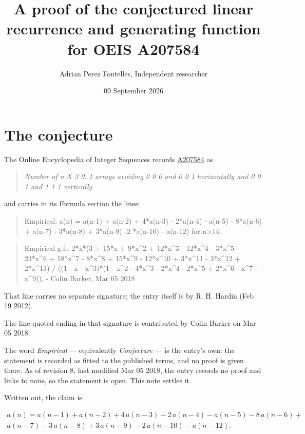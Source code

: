 \documentclass[11pt]{article}
\title{A proof of the conjectured linear recurrence and generating function for OEIS A207584}
\author{Adrian Perez Fontelles, Independent researcher}
\date{09 September 2026}
\theoremstyle{definition}
\begin{document}
\maketitle
\section{The conjecture}

The Online Encyclopedia of Integer Sequences records \href{https://oeis.org/A207584}{A207584} as

\begin{quote}\itshape Number of n X 3 0..1 arrays avoiding 0 0 0 and 0 0 1 horizontally and 0 0 1 and 1 1 1 vertically\end{quote}

and carries in its Formula section the lines:

\begin{quote}\ttfamily Empirical: a(n) = a(n-1) + a(n-2) + 4*a(n-3) - 2*a(n-4) - a(n-5) - 8*a(n-6) + a(n-7) - 3*a(n-8) + 3*a(n-9) -2 *a(n-10) - a(n-12) for n>14.\end{quote}

\begin{quote}\ttfamily Empirical g.f.: 2*x*(3 + 15*x + 9*x\textasciicircum{}2 + 12*x\textasciicircum{}3 - 12*x\textasciicircum{}4 - 3*x\textasciicircum{}5 - 23*x\textasciicircum{}6 + 18*x\textasciicircum{}7 - 8*x\textasciicircum{}8 + 15*x\textasciicircum{}9 - 12*x\textasciicircum{}10 + 3*x\textasciicircum{}11 - 3*x\textasciicircum{}12 + 2*x\textasciicircum{}13) / ((1 - x - x\textasciicircum{}3)*(1 - x\textasciicircum{}2 - 4*x\textasciicircum{}3 - 2*x\textasciicircum{}4 - 2*x\textasciicircum{}5 + 2*x\textasciicircum{}6 - x\textasciicircum{}7 - x\textasciicircum{}9)). - Colin Barker, Mar 05 2018\end{quote}

That line carries no separate signature; the entry itself is by R. H. Hardin (Feb 19 2012).

The line quoted ending in that signature is contributed by Colin Barker on Mar 05 2018.

The word {\itshape Empirical} --- equivalently {\itshape Conjecture} --- is the entry's own: the statement is recorded as fitted to the published terms, and no proof is given there. As of revision 8, last modified Mar 05 2018, the entry records no proof and links to none, so the statement is open. This note settles it.

Written out, the claim is

\begin{multline*} a(n) = a(n-1) + a(n-2) + 4\,a(n-3) - 2\,a(n-4) - a(n-5) - 8\,a(n-6) + \\ a(n-7) - 3\,a(n-8) + 3\,a(n-9) - 2\,a(n-10) - a(n-12). \end{multline*}
\end{document}
